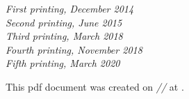 \documentclass[11pt,fleqn]{book} %
\begin{document}
\noindent \textit{First printing, December 2014} \\  %
\noindent \textit{Second printing, June 2015}    \\  %
\noindent \textit{Third printing, March 2018}    \\  %
\noindent \textit{Fourth printing, November 2018} \\ %
\noindent \textit{Fifth printing, March 2020} %

\noindent This pdf document was created on \textit{\the\day/\the\month/\the\year} at \textit{\DTMcurrenttime}.



\pagestyle{empty} %


\tableofcontents %
\listoftables
\listoffigures
\lstlistoflistings

\cleardoublepage %

\pagestyle{fancy} %


\mainmatter


\backmatter


\end{document}
